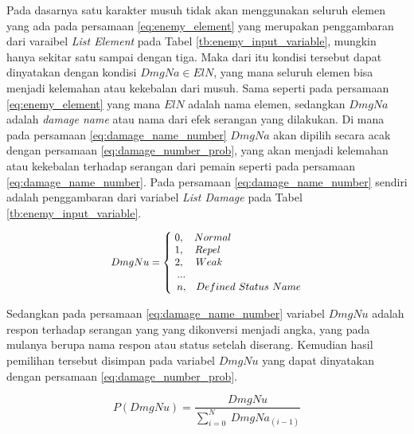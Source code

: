Pada dasarnya satu karakter musuh tidak akan menggunakan seluruh elemen yang ada pada persamaan \ref{eq:enemy_element} yang merupakan penggambaran dari varaibel \textit{List Element} pada Tabel \ref{tb:enemy_input_variable}, mungkin hanya sekitar satu sampai dengan tiga. Maka dari itu kondisi tersebut dapat dinyatakan dengan kondisi $DmgNa \in ElN$, yang mana seluruh elemen bisa menjadi kelemahan atau kekebalan dari musuh. Sama seperti pada persamaan \ref{eq:enemy_element} yang mana $ElN$ adalah nama elemen, sedangkan $DmgNa$ adalah \textit{damage name} atau nama dari efek serangan yang dilakukan. Di mana pada persamaan \ref{eq:damage_name_number} $DmgNa$ akan dipilih secara acak dengan persamaan \ref{eq:damage_number_prob}, yang akan menjadi kelemahan atau kekebalan terhadap serangan dari pemain seperti pada persamaan \ref{eq:damage_name_number}. Pada persamaan \ref{eq:damage_name_number} sendiri adalah penggambaran dari variabel \textit{List Damage} pada Tabel \ref{tb:enemy_input_variable}. 

\begin{equation}\label{eq:damage_name_number}
\resizebox{0.5\textwidth}{!}{%
	$DmgNu = \left\{\begin{matrix} 
	\hspace{0.0em} 0,  & \hspace{-7.0em} Normal \\
	\hspace{0.0em} 1,  & \hspace{-8.0em} Repel \\
	\hspace{0.0em} 2,  & \hspace{-7.7em} Weak \\
	\hspace{0.5em} ... & \\
	\hspace{0.5em} n,  & Defined\ Status\ Name
	\end{matrix}\right.$%
}
\end{equation}

Sedangkan pada persamaan \ref{eq:damage_name_number} variabel $DmgNu$ adalah respon terhadap serangan yang yang dikonversi menjadi angka, yang pada mulanya berupa nama respon atau status setelah diserang. Kemudian hasil pemilihan tersebut disimpan pada variabel $DmgNu$ yang dapat dinyatakan dengan persamaan \ref{eq:damage_number_prob}.

\begin{equation}\label{eq:damage_number_prob}
P(DmgNu) = \frac{DmgNu}{\sum_{i = 0}^{N}\ DmgNa_{(i - 1)}}
\end{equation}


